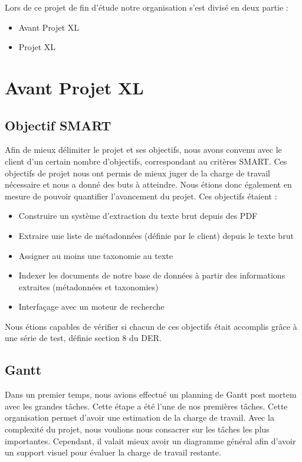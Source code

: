 Lors de ce projet de fin d’étude notre organisation s’est divisé en deux partie : 
\begin{itemize}
    \item Avant Projet XL 
    \item Projet XL 
\end{itemize}

\section{Avant Projet XL}

\subsection{Objectif SMART}
Afin de mieux délimiter le projet et ses objectifs, nous avons convenu avec le client d'un certain nombre d'objectifs, correspondant au critères SMART. Ces objectifs de projet nous ont permis de mieux juger de la charge de travail nécessaire et nous a donné des buts à atteindre. Nous étions donc également en mesure de pouvoir quantifier l'avancement du projet. Ces objectifs étaient : 

\begin{itemize}
    \item Construire un système d'extraction du texte brut depuis des PDF  
    \item Extraire une liste de métadonnées (définie par le client) depuis le texte brut
    \item Assigner au moins une taxonomie au texte 
    \item Indexer les documents de notre base de données à partir des informations extraites (métadonnées et taxonomies)
    \item Interfaçage avec un moteur de recherche  
\end{itemize}

Nous étions capables de vérifier si chacun de ces objectifs était accomplis grâce à une série de test, définie section 8 du DER. 



\subsection{Gantt}
Dans un premier temps, nous avions effectué un planning de Gantt post mortem avec les grandes tâches. Cette étape a été l’une de nos premières tâches. Cette organisation permet d’avoir une estimation de la charge de travail. 
Avec la complexité du projet, nous voulions nous consacrer sur les tâches les plus importantes. Cependant, il valait mieux avoir un diagramme général afin d’avoir un support visuel pour évaluer la charge de travail restante. 

